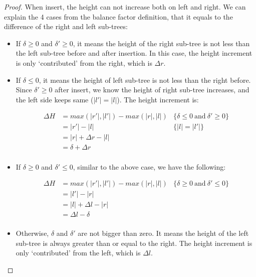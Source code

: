 \documentclass[b5paper]{article}
\begin{document}
\begin{proof}
When insert, the height can not increase both on left and right. We can explain the 4 cases from the balance factor definition, that it equals to the difference of the right and left sub-trees:

\begin{itemize}
\item If $\delta \geq 0$ and $\delta' \geq 0$, it means the height
of the right sub-tree is not less than the left sub-tree before and after insertion. In this case, the height increment is only `contributed' from the right, which is $\Delta r$.

\item If $\delta \leq 0$, it means the height of left sub-tree is not less than the right before. Since $\delta' \geq 0$ after insert, we know the height of right sub-tree increases, and the left side keeps same ($|l'|=|l|$). The height increment is:

\[
\begin{array}{rll}
\Delta H & = max(|r'|, |l'|) - max (|r|, |l|) & \{\delta \leq 0\ \text{and}\ \delta' \geq 0 \}\\
         & = |r'|-|l| & \{|l|=|l'|\}\\
         & = |r|+\Delta r - |l| & \\
         & = \delta + \Delta r & \\
\end{array}
\]

\item If $\delta \geq 0$ and $\delta' \leq 0$, similar to the above case, we have the following:

\[
\begin{array}{rll}
\Delta H & = max(|r'|, |l'|) - max (|r|, |l|) & \{\delta \geq 0\ \text{and}\ \delta' \leq 0 \}\\
         & = |l'|-|r| & \\
         & = |l| + \Delta l - |r| & \\
         & = \Delta l - \delta & \\
\end{array}
\]

\item Otherwise, $\delta$ and $\delta'$ are not bigger than zero. It means the height of the left sub-tree is always greater than or equal to the right. The height increment is only `contributed' from the left, which is $\Delta l$.
\end{itemize}
\end{proof}
\end{document}
